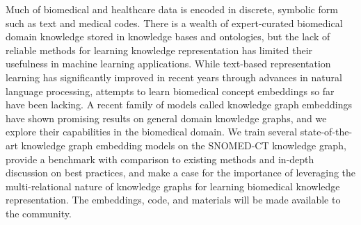 Much of biomedical and healthcare data is encoded in discrete, symbolic form such as text and medical codes. There is a wealth of expert-curated biomedical domain knowledge stored in knowledge bases and ontologies, but the lack of reliable methods for learning knowledge representation has limited their usefulness in machine learning applications. While text-based representation learning has significantly improved in recent years through advances in natural language processing, attempts to learn biomedical concept embeddings so far have been lacking. A recent family of models called knowledge graph embeddings have shown promising results on general domain knowledge graphs, and we explore their capabilities in the biomedical domain. We train several state-of-the-art knowledge graph embedding models on the SNOMED-CT knowledge graph, provide a benchmark with comparison to existing methods and in-depth discussion on best practices, and make a case for the importance of leveraging the multi-relational nature of knowledge graphs for learning biomedical knowledge representation. The embeddings, code, and materials will be made available to the community.

